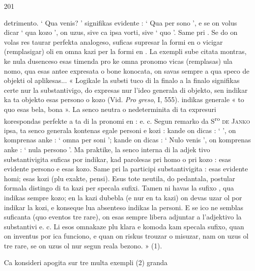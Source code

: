 \begin{VUpage}[205]{201}

\VUcontinue
detrimento. ` Qua venis? ' signifikas evidente : ` Qua per\cc
sono ', e se on volus dicar ` qua kozo ', on uzus, sive ca\nl
ipsa vorti, sive ` quo '. Same pri . Se do on volas res\cc
taurar perfekta analogeso, suficas supresar la formi en \nl
o vicigar (remplasigar) oli en omna kazi per la formi en .\nl
La exempli sube citata montras, ke nula dusenceso esas\nl
timenda pro ke omna pronomo vicas (remplasas) ula nomo,\nl
qua esas antee expresata o bone konocata, on savas sempre\nl
a qua speco de objekti ol aplikesas... « Logikale la substi\cc
tuco di la finalo  a la finalo  signifikas certe nur la\nl
substantivigo, do expresas nur l'ideo generala di objekto,\nl
sen indikar ka ta objekto esas persono o kozo (Vid. \textit{Pro}\cc
\textit{greso}, I, 555).  indikas generale « to quo\nl
esas bela, bona ». La senco neutra o nedeterminita di ta\nl
expresuri korespondas perfekte a ta di la pronomi en  :\nl
{} e. c. Segun remarko da S\textsuperscript{ro} \textsc{de}\nl
\textsc{Janko} ipsa, ta senco generala kontenas egale personi e kozi :\nl
kande on dicas : `  ', on komprenas anke : ` omna per\cc
soni '; kande on dicas : ` Nulo venis ', on komprenas anke :\nl
` nula persono '. Ma praktike, la senco interna di la adjek\cc
tivo substantivigita suficas por indikar, kad parolesas pri\nl
homo o pri kozo :  esas evidente persono e \nl
esas kozo. Same pri la participi substantivigita : \cc
{} esas evidente homi; \nl
{} esas kozi (plu exakte, pensi). Esus tote neutila, do\nl
pedantala, postular formala distingo di ta kazi per specala\nl
sufixi. Tamen ni havas la sufixo , qua indikas sempre\nl
kozo; en la kazi dubebla (e nur en ta kazi) on devas uzar\nl
ol por indikar la kozi, e konseque lua absenteso indikas la\nl
personi. E se ico ne semblas suficanta (quo eventos tre rare),\nl
on esas sempre libera adjuntar a l'adjektivo la substantivi\nl
{} e. c. Li esos omnakaze plu klara e komoda\nl
kam specala sufixo, quan on inventus por ica funciono, e\nl
quan on riskus trouzar o misuzar, nam on uzus ol tre rare,\nl
se on uzus ol nur segun reala bezono. » (1).

Ca konsideri apogita sur tre multa exempli (2) granda\cc
\end{VUpage}

